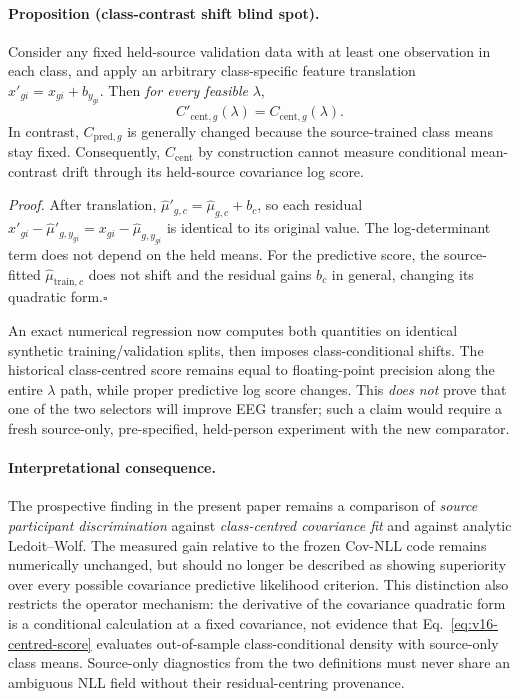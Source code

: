 \paragraph{Proposition (class-contrast shift blind spot).}
Consider any fixed held-source validation data with
at least one observation in each class, and apply an
arbitrary class-specific feature translation
$x'_{gi}=x_{gi}+b_{y_{gi}}$.
Then \emph{for every feasible} $\lambda$,
\[
 C'_{\mathrm{cent},g}(\lambda)
 = C_{\mathrm{cent},g}(\lambda).
\]
In contrast, $C_{\mathrm{pred},g}$ is generally changed
because the source-trained class means stay fixed.
Consequently, $C_{\mathrm{cent}}$ by construction
cannot measure conditional mean-contrast drift through
its held-source covariance log score.

\emph{Proof.} After translation,
$\widehat\mu'_{g,c}=\widehat\mu_{g,c}+b_c$,
so each residual
$x'_{gi}-\widehat\mu'_{g,y_{gi}}=
x_{gi}-\widehat\mu_{g,y_{gi}}$
is identical to its original value. The log-determinant
term does not depend on the held means. For the
predictive score, the source-fitted
$\widehat\mu_{\mathrm{train},c}$ does not shift and
the residual gains $b_c$ in general, changing its
quadratic form.\hfill$\square$

An exact numerical regression now computes both quantities
on identical synthetic training/validation splits, then
imposes class-conditional shifts. The historical
class-centred score remains equal to floating-point
precision along the entire $\lambda$ path, while
proper predictive log score changes. This
\emph{does not} prove that one of the two selectors
will improve EEG transfer; such a claim would require
a fresh source-only, pre-specified, held-person
experiment with the new comparator.

\paragraph{Interpretational consequence.}
The prospective finding in the present paper remains
a comparison of \emph{source participant discrimination}
against \emph{class-centred covariance fit} and
against analytic Ledoit--Wolf. The measured gain
relative to the frozen Cov-NLL code remains
numerically unchanged, but should no longer be described
as showing superiority over every possible covariance
predictive likelihood criterion.
This distinction also restricts the operator mechanism:
the derivative of the covariance quadratic form
is a conditional calculation at a fixed covariance,
not evidence that Eq.~\eqref{eq:v16-centred-score}
evaluates out-of-sample class-conditional density
with source-only class means. Source-only diagnostics
from the two definitions must never share an
ambiguous NLL field without their
residual-centring provenance.
